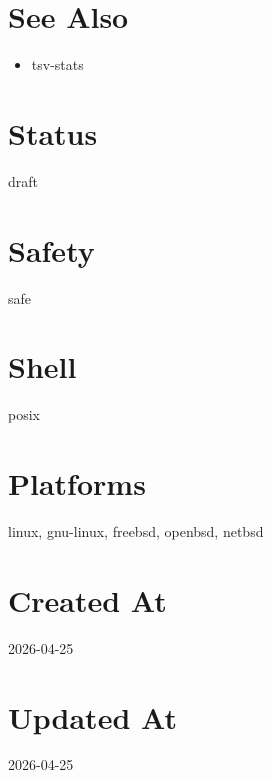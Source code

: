 \documentclass{article}
\begin{document}
\section*{See Also}
\begin{itemize}
  \item tsv-stats
\end{itemize}

\section*{Status}
draft

\section*{Safety}
safe

\section*{Shell}
posix

\section*{Platforms}
linux, gnu-linux, freebsd, openbsd, netbsd

\section*{Created At}
2026-04-25

\section*{Updated At}
2026-04-25
\end{document}
